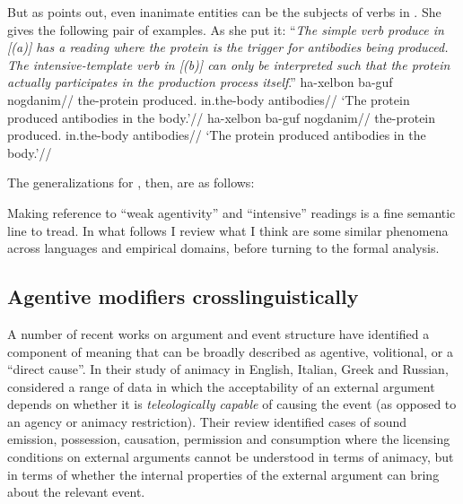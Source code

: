 {But as \citet[21]{doron03} points out, even inanimate entities can be the subjects of verbs in {\tpie}. She gives the following pair of examples. As she put it: ``\textit{The simple verb \emph{produce} in \emph{[(\nextx a)]} has a reading where the protein is the trigger for antibodies being produced. The intensive-template verb in \emph{[(\nextx b)]} can only be interpreted such that the protein actually participates in the production process itself}.''
\pex
	\a \begingl
		\gla ha-xelbon  ba-guf nogdanim//
		\glb the-protein produced. in.the-body antibodies//
		\glft `The protein produced antibodies in the body.'//
		\endgl
	\a \begingl
		\gla ha-xelbon  ba-guf nogdanim//
		\glb the-protein produced. in.the-body antibodies//
		\glft `The protein produced antibodies in the body.'//
		\endgl
\xe

The generalizations for {\tpie}, then, are as follows:

Making reference to ``weak agentivity'' and ``intensive'' readings is a fine semantic line to tread. In what follows I review what I think are some similar phenomena across languages and empirical domains, before turning to the formal analysis.

	\subsection{Agentive modifiers crosslinguistically} \label{voice:tpiel:act}
A number of recent works on argument and event structure have identified a component of meaning that can be broadly described as agentive, volitional, or a ``direct cause''. In their study of animacy in English, Italian, Greek and Russian, \cite{folliharley08} considered a range of data in which the acceptability of an external argument depends on whether it is \emph{teleologically capable} of causing the event (as opposed to an agency or animacy restriction). Their review identified cases of sound emission, possession, causation, permission and consumption where the licensing conditions on external arguments cannot be understood in terms of animacy, but in terms of whether the internal properties of the external argument can bring about the relevant event.

}
